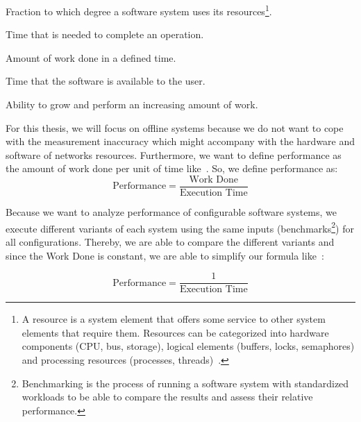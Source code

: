 \begin{description}[style=multiline,leftmargin=10em]
	\item [Resource Utilization] Fraction to which degree a software system uses its resources\footnote{A resource is a system element that offers some service to other system elements that require them. Resources can be categorized into hardware components (CPU, bus, storage), logical elements (buffers, locks, semaphores) and processing resources (processes, threads)~\cite{woodside2007future}.}.
	\item [Response Time] Time that is needed to complete an operation.
	\item [Throughput] Amount of work done in a defined time.
	\item [Availability] Time that the software is available to the user.
	\item [Scalability] Ability to grow and perform an increasing amount of work. 
\end{description}

For this thesis, we will focus on offline systems because we do not want to cope with the measurement inaccuracy which might accompany with the hardware and software of networks resources.
Furthermore, we want to define performance as the amount of work done per unit of time like~\cite{tsirogiannis2010analyzing}. 
So, we define performance as:
\begin{equation}
	\label{def:perf1}
	\mbox{Performance}=\frac{\mbox{Work Done}}{\mbox{Execution Time}}
\end{equation}

Because we want to analyze performance of configurable software systems, we execute different variants of each system using the same inputs (benchmarks\footnote{Benchmarking is the process of running a software system with standardized workloads to be able to compare the results and assess their relative performance.}) for all configurations. 
Thereby, we are able to compare the different variants and since the \textsf{Work Done} is constant, we are able to simplify our formula like~\cite{siegmund2015performance}:

\begin{equation}
	\label{def:perf2}
	\mbox{Performance}=\frac{\mbox{1}}{\mbox{Execution Time}}
\end{equation}


